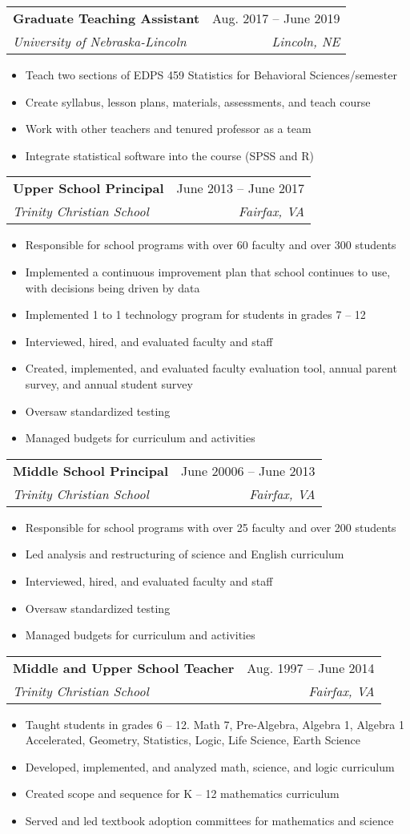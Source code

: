 \documentclass[letterpaper,11pt]{article}
\makeatletter
\newcommand{\resumeItem}[1]{
  \item\small{
    {#1 \vspace{-2pt}}
  }
}
\newcommand{\resumeSubheading}[4]{
  \vspace{-2pt}\item
    \begin{tabular*}{0.97\textwidth}[t]{l@{\extracolsep{\fill}}r}
      \textbf{#1} & #2 \\
      \textit{\small#3} & \textit{\small #4} \\
    \end{tabular*}\vspace{-7pt}
}
\newcommand{\resumeSubSubheading}[2]{
    \item
    \begin{tabular*}{0.97\textwidth}{l@{\extracolsep{\fill}}r}
      \textit{\small#1} & \textit{\small #2} \\
    \end{tabular*}\vspace{-7pt}
}
\newcommand{\resumeSubHeadingListEnd}{\end{itemize}}
\newcommand{\resumeItemListStart}{\begin{itemize}}
\newcommand{\resumeItemListEnd}{\end{itemize}\vspace{-5pt}}
\makeatother
\begin{document}

    \resumeSubheading
      {Graduate Teaching Assistant}{Aug. 2017 -- June 2019}
      {University of Nebraska-Lincoln}{Lincoln, NE}
      \resumeItemListStart
        \resumeItem{Teach two sections of EDPS 459 Statistics for Behavioral Sciences/semester}
        \resumeItem{Create syllabus, lesson plans, materials, assessments, and teach course}
        \resumeItem{Work with other teachers and tenured professor as a team}
        \resumeItem{Integrate statistical software into the course (SPSS and R)}
    \resumeItemListEnd

    \resumeSubheading
      {Upper School Principal}{June 2013 -- June 2017}
      {Trinity Christian School}{Fairfax, VA}
      \resumeItemListStart
        \resumeItem{Responsible for school programs with over 60 faculty and over 300 students}
        \resumeItem{Implemented a continuous improvement plan that school continues to use, with decisions being driven by data}
        \resumeItem{Implemented 1 to 1 technology program for students in grades 7 – 12}
        \resumeItem{Interviewed, hired, and evaluated faculty and staff}
        \resumeItem{Created, implemented, and evaluated faculty evaluation tool, annual parent survey, and annual student survey}
        \resumeItem{Oversaw standardized testing}
        \resumeItem{Managed budgets for curriculum and activities}
      \resumeItemListEnd

    \resumeSubheading
      {Middle School Principal}{June 20006 -- June 2013}
      {Trinity Christian School}{Fairfax, VA}
        \resumeItemListStart
        \resumeItem{Responsible for school programs with over 25 faculty and over 200 students}
        \resumeItem{Led analysis and restructuring of science and English curriculum}
        \resumeItem{Interviewed, hired, and evaluated faculty and staff}
        \resumeItem{Oversaw standardized testing}
        \resumeItem{Managed budgets for curriculum and activities}
    \resumeSubHeadingListEnd

  \resumeSubheading
      {Middle and Upper School Teacher}{Aug. 1997 -- June 2014}
      {Trinity Christian School}{Fairfax, VA}
      \resumeItemListStart
      \resumeItem{Taught students in grades 6 – 12. Math 7, Pre-Algebra, Algebra 1, Algebra 1 Accelerated, Geometry, Statistics, Logic, Life Science, Earth Science}
      \resumeItem{Developed, implemented, and analyzed math, science, and logic curriculum}
      \resumeItem{Created scope and sequence for K – 12 mathematics curriculum}
      \resumeItem{Served and led textbook adoption committees for mathematics and science}
    \resumeSubHeadingListEnd
\end{document}
